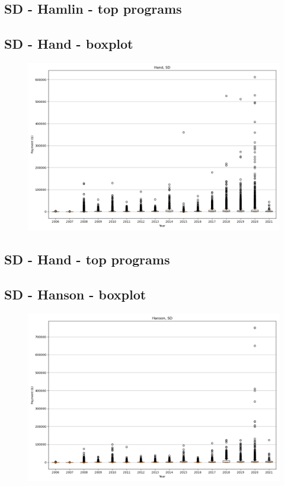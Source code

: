 \subsection*{SD - Hamlin - top programs}

\newpage
\subsection*{SD - Hand - boxplot}
\begin{figure}[h]
\centering
\includegraphics[width=7in]{../output/boxplots/counties/Hand-SD_boxplot.png}
\end{figure}


\subsection*{SD - Hand - top programs}

\newpage
\subsection*{SD - Hanson - boxplot}
\begin{figure}[h]
\centering
\includegraphics[width=7in]{../output/boxplots/counties/Hanson-SD_boxplot.png}
\end{figure}


